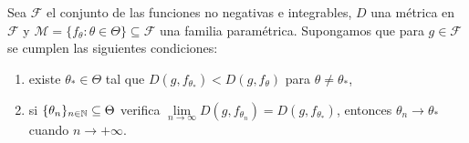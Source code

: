 

Sea $\mathcal{F}$ el conjunto de las funciones no negativas e integrables, $D$ una métrica en $\mathcal{F}$ y $\mathcal{M} = \{f_{\theta}: \theta\in\Theta \} \subseteq \mathcal{F}$
una familia paramétrica. Supongamos que para $g\in\mathcal{F}$ se cumplen las siguientes condiciones:
\begin{enumerate}[{\rm C1.}]
	\label{condiciones}
	\item \label{item: theta_0}
	existe $\theta_{*} \in \Theta$ tal que $D(g,f_{\theta_{*}}) < D(g,f_{\theta})$ para $\theta \ne \theta_{*}$,
	\item \label{item: theta_n}
	si $\{\theta_{n}\}_{n\in\mathbb{N}} \subseteq \Theta$ verifica 
	$\lim\limits_{n\to\infty} D(g,f_{\theta_{n}}) = D(g,f_{\theta_{*}})$, entonces $\theta_{n} \to \theta_{*}$ cuando $n \to +\infty$.
\end{enumerate}

